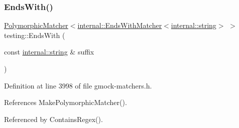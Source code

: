 \subsubsection{\texorpdfstring{Ends\+With()}{EndsWith()}}
{\footnotesize\ttfamily \hyperlink{classtesting_1_1PolymorphicMatcher}{Polymorphic\+Matcher}$<$\hyperlink{classtesting_1_1internal_1_1EndsWithMatcher}{internal\+::\+Ends\+With\+Matcher}$<$\hyperlink{namespacetesting_1_1internal_a8e8ff5b11e64078831112677156cb111}{internal\+::string}$>$ $>$ testing\+::\+Ends\+With (\begin{DoxyParamCaption}\item[{const \hyperlink{namespacetesting_1_1internal_a8e8ff5b11e64078831112677156cb111}{internal\+::string} \&}]{suffix }\end{DoxyParamCaption})\hspace{0.3cm}{\ttfamily [inline]}}



Definition at line 3998 of file gmock-\/matchers.\+h.



References Make\+Polymorphic\+Matcher().



Referenced by Contains\+Regex().


